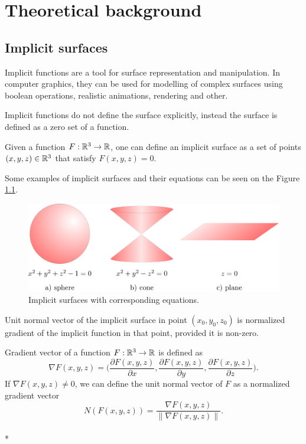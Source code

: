 \chapter{Theoretical background}
\label{chap1} %

\section{Implicit surfaces}
\label{sub2.1}

Implicit functions are a tool for surface representation and manipulation.
In computer graphics, they can be used for modelling of complex surfaces
using boolean operations, realistic animations, rendering and other.

Implicit functions do not define the surface explicitly, instead
the surface is defined as a zero set of a function.
\begin{definition}
    Given a function $F: \mathbb{R}^3 \to \mathbb{R}$, one can define an implicit surface
    as a set of points $(x, y, z)\in \mathbb{R}^3$ that satisfy $F(x, y, z) = 0$.
\end{definition}

Some examples of implicit surfaces and their equations can be seen on
the Figure \ref{img:1}.

\begin{figure}
    \centerline{\includegraphics[scale=0.5]{images/img1}}
    \caption[Implicit surfaces with corresponding equations]
    {Implicit surfaces with corresponding equations.}
    \label{img:1}
\end{figure}

Unit normal vector of the implicit surface in point $(x_0, y_0, z_0)$ is
normalized gradient of the implicit function in that point, provided it is
non-zero.

\begin{definition}
    Gradient vector of a function $F:\mathbb{R}^3 \to \mathbb{R}$ is defined as 
    $$\nabla F(x, y, z) = \bigg(\frac{\partial F(x, y, z)}{\partial x}, \frac{\partial F(x, y, z)}{\partial y}, 
    \frac{\partial F(x, y, z)}{\partial z}\bigg).$$
    If $\nabla F(x,y,z) \neq 0$, we can define the unit normal vector of $F$ as 
    a normalized gradient vector
    $$N(F(x, y, z))  = \frac{\nabla F(x, y, z)}{\| \nabla F(x, y, z) \|}.$$
    \\*
\end{definition}

